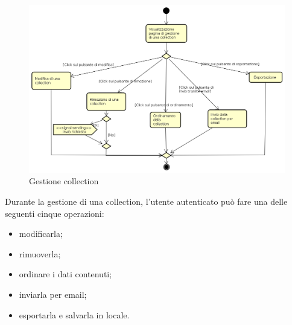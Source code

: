 \begin{figure}[H]
\begin{center}
\includegraphics[width=16cm]{res/sections/backend/activities/gestioneCollection.png}
\caption{Gestione collection}
\end{center}
\end{figure}
Durante la gestione di una collection, l'utente autenticato può fare una delle seguenti cinque operazioni:
\begin{itemize}
\item modificarla;
\item rimuoverla;
\item ordinare i dati contenuti;
\item inviarla per email;
\item esportarla e salvarla in locale.
\end{itemize}
